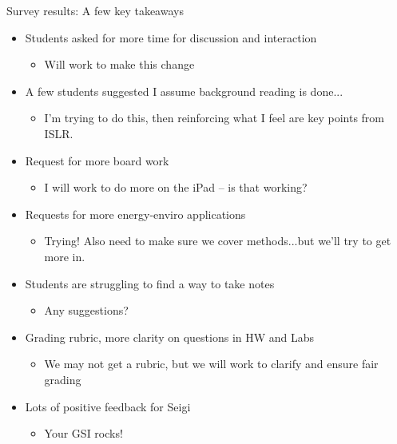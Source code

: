 \documentclass[aspectratio=169]{beamer}
\begin{document}
\begin{frame}{Survey results: A few key takeaways}


\begin{itemize}
\item Students asked for more time for discussion and interaction
\begin{itemize}
\item<2-> Will work to make this change
\end{itemize}
\item A few students suggested I assume background reading is done...
\begin{itemize}
\item<3-> I'm trying to do this, then reinforcing what I feel are key points from ISLR.
\end{itemize}
\item Request for more board work
\begin{itemize}
\item<4-> I will work to do more on the iPad -- is that working?
\end{itemize}
\item Requests for more energy-enviro applications
\begin{itemize}
\item<5-> Trying!  Also need to make sure we cover methods...but we'll try to get more in.
\end{itemize}
\item Students are struggling to find a way to take notes
\begin{itemize}
\item<6-> Any suggestions?
\end{itemize}
\item Grading rubric, more clarity on questions in HW and Labs
\begin{itemize}
\item<7-> We may not get a rubric, but we will work to clarify and ensure fair grading
\end{itemize}
\item Lots of positive feedback for Seigi
\begin{itemize}
\item<8-> Your GSI rocks!
\end{itemize}
\end{itemize}
\end{frame}
\end{document}

